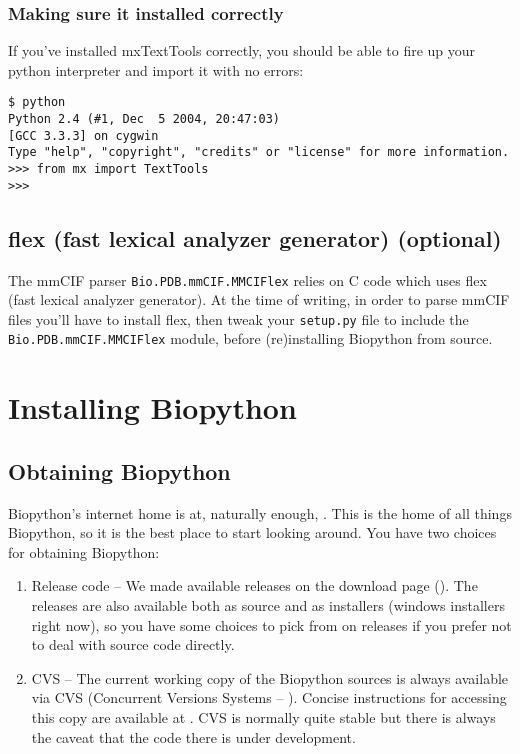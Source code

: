 \documentclass{article}
\begin{document}
\subsubsection{Making sure it installed correctly}

If you've installed mxTextTools correctly, you should be able to fire up
your python interpreter and import it with no errors:

\begin{verbatim}
$ python
Python 2.4 (#1, Dec  5 2004, 20:47:03)
[GCC 3.3.3] on cygwin
Type "help", "copyright", "credits" or "license" for more information.
>>> from mx import TextTools
>>>
\end{verbatim}

\subsection{flex (fast lexical analyzer generator) (optional)}

The mmCIF parser \verb|Bio.PDB.mmCIF.MMCIFlex| relies on C code which
uses flex (fast lexical analyzer generator).  At the time of writing,
in order to parse mmCIF files you'll have to install flex, then tweak
your \verb|setup.py| file to include the \verb|Bio.PDB.mmCIF.MMCIFlex|
module, before (re)installing Biopython from source.

\section{Installing Biopython}

\subsection{Obtaining Biopython}
Biopython's internet home is at, naturally enough,  
. This is the home of all things 
Biopython, so it is the best place to start looking around. 
You have two choices for obtaining Biopython:

\begin{enumerate}

\item Release code -- We made available releases on the download page 
(). 
The releases are also available both as source and as installers 
(windows installers right now), so you have some choices to pick from 
on releases if you prefer not to deal with source code directly.

\item CVS -- The current working copy of the Biopython sources is always
available via CVS (Concurrent Versions Systems --
). Concise instructions for
accessing this copy are available at
. CVS is normally quite stable
but there is always the caveat that the code there is under
development.

\end{enumerate}
\end{document}
